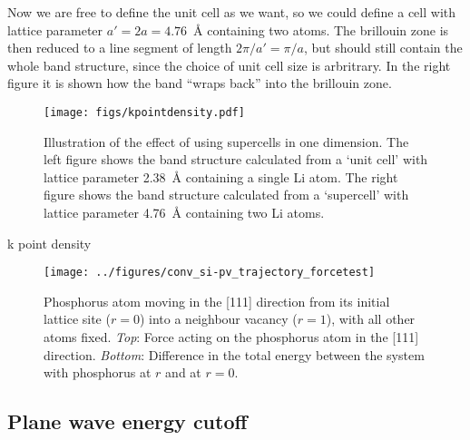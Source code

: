 \documentclass[11pt,bibliography=totoc,index=totoc]{scrbook}   %
\begin{document}
Now we are free to define the unit cell as we want, so we could define a
cell with lattice parameter $a'=2a=4.76$~Å containing two atoms. 
The brillouin zone is then reduced to a line segment of length $2\pi/a'=\pi/a$,
but should still contain the whole band structure, since the choice of unit cell size is arbritrary.
In the right figure it is shown how the band ``wraps back'' into the brillouin zone.

\begin{figure}[htp]
  \centering
  \texttt{[image: figs/kpointdensity.pdf]}
  \caption{Illustration of the effect of using supercells in one dimension. 
  The left figure shows the band structure calculated from a `unit cell' with
  lattice parameter 2.38~Å containing a single Li atom.
  The right figure shows the band structure calculated from a `supercell' with
  lattice parameter 4.76~Å containing two Li atoms.}
  \label{fig:kpointdensities}
\end{figure}


k point density



\begin{figure}[htbp]
  \begin{center}
    \texttt{[image: ../figures/conv\_si-pv\_trajectory\_forcetest]}
  \end{center}
  \caption{Phosphorus atom moving in the [111] direction from its initial lattice site ($r=0$) into a neighbour vacancy ($r=1$),
    with all other atoms fixed.
    \textit{Top}: Force acting on the phosphorus atom in the [111] direction. 
    \textit{Bottom}: Difference in the total energy between the system with phosphorus at $r$ and at $r=0$.
    }
  \label{fig:conv_si-pv_trajectory_forcetest}
\end{figure}

\subsection{Plane wave energy cutoff}
\end{document}
